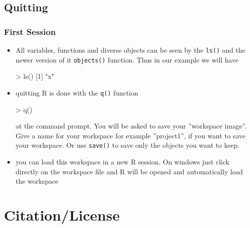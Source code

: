 \documentclass[xcolor={table},c]{beamer}
\begin{document}
\subsection{Quitting}
\begin{frame}[fragile]\frametitle{First Session}
\begin{itemize}
\item All variables, functions and diverse objects can be seen by the \texttt{ls()} and the newer version of it \texttt{objects()} function. Thus in our example we will have
\begin{semiverbatim}
> ls()
[1] "x"
\end{semiverbatim}
\item quitting R is done with the  \texttt{q()} function
\begin{semiverbatim}
> q()
\end{semiverbatim}
at the command prompt. You will be asked to save your ''workspace image''. Give a name for your workspace for example ''project1'', if you want to save your workspace. Or use \texttt{save()} to save only the objects you want to keep.
\item you can load this workspace in a new R session. On windows just click directly on the workspace file and R will be opened and automatically load the workspace
\end{itemize}
\end{frame}



\section{Citation/License}
\end{document}
